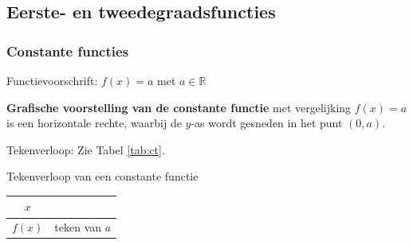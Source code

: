 \subsection{Eerste- en tweedegraadsfuncties}
\label{sec:eerste_tweede}

\subsubsection{Constante functies}

\begin{definitie}
	Functievoorschrift: $f(x)=a$ met $a\in\mathbb{R}$
\end{definitie}


\textbf{Grafische voorstelling van de constante functie}
met vergelijking $f(x)=a$ is een horizontale rechte, waarbij de $y$-as
wordt gesneden in het punt $(0,a)$.


Tekenverloop: Zie Tabel \ref{tab:ct}.

\begin{tabel}{Tekenverloop van een constante functie}
	\begin{tabular}{c||c}
		$x$ & \\
		\hline 
		$f(x)$ & teken van $a$\\
	\end{tabular}
	\label{tab:ct}
\end{tabel}


